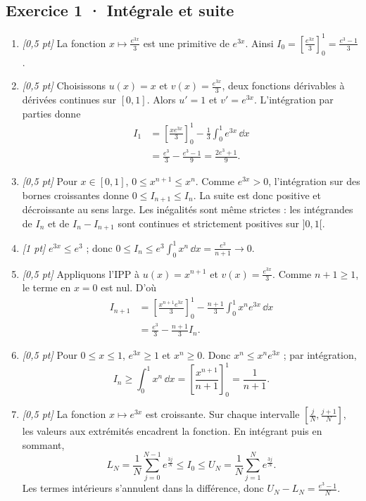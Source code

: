 \subsection*{Exercice 1 · Intégrale et suite}\begin{enumerate}

\item \textit{[0,5 pt]} La fonction $x\mapsto \frac{e^{3x}}{3}$ est une primitive de $e^{3x}$. Ainsi $I_0=[\frac{e^{3x}}{3}]_0^1=\frac{e^{3}-1}{3}$.

\item \textit{[0,5 pt]} Choisissons $u(x)=x$ et $v(x)=\frac{e^{3x}}{3}$, deux fonctions dérivables à dérivées continues sur $[0,1]$. Alors $u'=1$ et $v'=e^{3x}$. L'intégration par parties donne
\[\begin{aligned}I_1&=\left[\frac{xe^{3x}}{3}\right]_0^1-\frac{1}{3}\int_0^1e^{3x}\,\dd x\\&=\frac{e^{3}}{3}-\frac{e^{3}-1}{9}=\frac{2e^{3}+1}{9}.\end{aligned}\]

\item \textit{[0,5 pt]} Pour $x\in[0,1]$, $0\le x^{n+1}\le x^n$. Comme $e^{3x}>0$, l'intégration sur des bornes croissantes donne $0\le I_{n+1}\le I_n$. La suite est donc positive et décroissante au sens large. Les inégalités sont même strictes : les intégrandes de $I_n$ et de $I_n-I_{n+1}$ sont continues et strictement positives sur $]0,1[$.

\item \textit{[1 pt]} $e^{3x}\le e^{3}$ ; donc $0\le I_n\le e^{3}\int_0^1x^n\,\dd x=\frac{e^{3}}{n+1}\to0$.

\item \textit{[0,5 pt]} Appliquons l'IPP à $u(x)=x^{n+1}$ et $v(x)=\frac{e^{3x}}{3}$. Comme $n+1\ge1$, le terme en $x=0$ est nul. D'où
\[\begin{aligned}I_{n+1}&=\left[\frac{x^{n+1}e^{3x}}{3}\right]_0^1-\frac{n+1}{3}\int_0^1x^ne^{3x}\,\dd x\\&=\frac{e^{3}}{3}-\frac{n+1}{3}I_n.\end{aligned}\]

\item \textit{[0,5 pt]} Pour $0\le x\le1$, $e^{3x}\ge1$ et $x^n\ge0$. Donc $x^n\le x^ne^{3x}$ ; par intégration,
\[I_n\ge\int_0^1x^n\,\dd x=\left[\frac{x^{n+1}}{n+1}\right]_0^1=\frac{1}{n+1}.\]

\item \textit{[0,5 pt]} La fonction $x\mapsto e^{3x}$ est croissante. Sur chaque intervalle $[\frac{j}{N},\frac{j+1}{N}]$, les valeurs aux extrémités encadrent la fonction. En intégrant puis en sommant,
\[L_N=\frac{1}{N}\sum_{j=0}^{N-1}e^{\frac{3j}{N}}\le I_0\le U_N=\frac{1}{N}\sum_{j=1}^Ne^{\frac{3j}{N}}.\]
Les termes intérieurs s'annulent dans la différence, donc $U_N-L_N=\frac{e^{3}-1}{N}$.


\end{enumerate}
